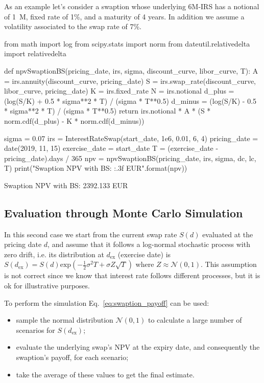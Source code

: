 As an example let's consider a swaption whose underlying 6M-IRS has a notional of 1~M, fixed rate of 1\%, and a maturity of 4 years. In addition we assume a volatility associated to the swap rate of 7\%.

\begin{ipython}
from math import log
from scipy.stats import norm
from dateutil.relativedelta import relativedelta

def npvSwaptionBS(pricing_date, irs, sigma, discount_curve, libor_curve, T):
    A = irs.annuity(discount_curve, pricing_date)
    S = irs.swap_rate(discount_curve, libor_curve, pricing_date)
    K = irs.fixed_rate
    N = irs.notional
    d_plus = (log(S/K) + 0.5 * sigma**2 * T) / (sigma * T**0.5)
    d_minus = (log(S/K) - 0.5 * sigma**2 * T) / (sigma * T**0.5)
    return irs.notional * A * (S * norm.cdf(d_plus) - K * norm.cdf(d_minus))

sigma = 0.07
irs = InterestRateSwap(start_date, 1e6, 0.01, 6, 4)
pricing_date = date(2019, 11, 15)
exercise_date = start_date
T = (exercise_date - pricing_date).days / 365
npv = npvSwaptionBS(pricing_date, irs, sigma, dc, lc, T)
print("Swaption NPV with BS: {:.3f} EUR".format(npv))
\end{ipython}
\begin{ioutput}
Swaption NPV with BS: 2392.133 EUR
\end{ioutput}

\subsection{Evaluation through Monte Carlo Simulation}
\label{evaluation-through-monte-carlo-simulation}

In this second case we start from the current swap rate \(S(d)\) evaluated at the pricing date \(d\), and assume that it follows a log-normal stochastic process with zero drift, i.e. its distribution at \(d_{\mathrm{ex}}\) (exercise date) is \(S(d_{\mathrm{ex}}) = S(d)\mathrm{exp}(-\frac{1}{2}\sigma^{2}T+\sigma Z\sqrt{T})\)
where $Z\approx\mathcal{N}(0,1)$. This assumption is not correct since we know that interest rate follows different processes, but it is ok for illustrative purposes. 

To perform the simulation Eq.~\ref{eq:swaption_payoff} can be used:

\begin{itemize}
\tightlist
\item
  sample the normal distribution \(\mathcal{N}(0, 1)\) to calculate a large number of scenarios for \(S(d_{\mathrm{ex}})\);
\item
  evaluate the underlying swap's NPV at the expiry date, and consequently the swaption's payoff, for each scenario;
\item
  take the average of these values to get the final estimate.
\end{itemize}

